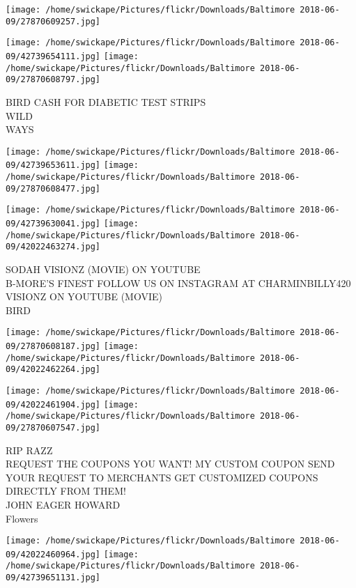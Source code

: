 \documentclass[10pt,letterpaper]{article}
\begin{document}
\texttt{[image: /home/swickape/Pictures/flickr/Downloads/Baltimore 2018-06-09/27870609257.jpg]}

\vspace{0.25in}
\texttt{[image: /home/swickape/Pictures/flickr/Downloads/Baltimore 2018-06-09/42739654111.jpg]}
\texttt{[image: /home/swickape/Pictures/flickr/Downloads/Baltimore 2018-06-09/27870608797.jpg]}

BIRD CASH FOR DIABETIC TEST STRIPS\\
WILD\\
WAYS\\
\pagebreak

\texttt{[image: /home/swickape/Pictures/flickr/Downloads/Baltimore 2018-06-09/42739653611.jpg]}
\texttt{[image: /home/swickape/Pictures/flickr/Downloads/Baltimore 2018-06-09/27870608477.jpg]}

\texttt{[image: /home/swickape/Pictures/flickr/Downloads/Baltimore 2018-06-09/42739630041.jpg]}
\texttt{[image: /home/swickape/Pictures/flickr/Downloads/Baltimore 2018-06-09/42022463274.jpg]}

SODAH VISIONZ (MOVIE) ON YOUTUBE\\
B{-}MORE'S FINEST FOLLOW US ON INSTAGRAM AT CHARMINBILLY420\\
VISIONZ ON YOUTUBE (MOVIE)\\
BIRD\\
\pagebreak

\texttt{[image: /home/swickape/Pictures/flickr/Downloads/Baltimore 2018-06-09/27870608187.jpg]}
\texttt{[image: /home/swickape/Pictures/flickr/Downloads/Baltimore 2018-06-09/42022462264.jpg]}

\texttt{[image: /home/swickape/Pictures/flickr/Downloads/Baltimore 2018-06-09/42022461904.jpg]}
\texttt{[image: /home/swickape/Pictures/flickr/Downloads/Baltimore 2018-06-09/27870607547.jpg]}

RIP RAZZ\\
REQUEST THE COUPONS YOU WANT!  MY CUSTOM COUPON SEND YOUR REQUEST TO MERCHANTS GET CUSTOMIZED COUPONS DIRECTLY FROM THEM!\\
JOHN EAGER HOWARD\\
Flowers\\
\pagebreak

\texttt{[image: /home/swickape/Pictures/flickr/Downloads/Baltimore 2018-06-09/42022460964.jpg]}
\texttt{[image: /home/swickape/Pictures/flickr/Downloads/Baltimore 2018-06-09/42739651131.jpg]}
\end{document}
